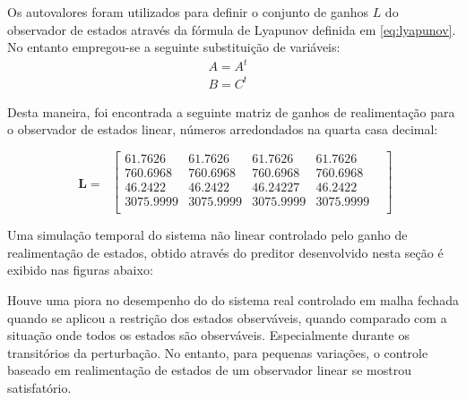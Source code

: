     Os autovalores foram utilizados para definir o conjunto de ganhos $L$ do observador de estados através da fórmula de Lyapunov definida em \ref{eq:lyapunov}. No entanto empregou-se a seguinte substituição de variáveis:
    \begin{equation} \label{eq:var_pred}
        \begin{split}
        A = A^{t}&\\
        B = C^{t}&
        \end{split}
    \end{equation}

    Desta maneira, foi encontrada a seguinte matriz de ganhos de realimentação para o observador de estados linear, números arredondados na quarta casa decimal:

    \begin{equation} \label{eq:ganhos_pred}
        \begin{split}
            \mathbf{L}=\
        \end{split}
        \begin{bmatrix}
          61.7626&   61.7626&   61.7626&   61.7626&\\
         760.6968&  760.6968&  760.6968&  760.6968&\\
          46.2422&   46.2422&   46.24227&  46.2422&\\
        3075.9999& 3075.9999& 3075.9999& 3075.9999&\\
        \end{bmatrix}
    \end{equation}

    Uma simulação temporal do sistema não linear controlado pelo ganho de realimentação de estados, obtido através do preditor desenvolvido nesta seção é exibido nas figuras abaixo:

    Houve uma piora no desempenho do do sistema real controlado em malha fechada quando se aplicou a restrição dos estados observáveis, quando comparado com a situação onde todos os estados são observáveis. Especialmente durante os transitórios da perturbação. No entanto, para pequenas variações, o controle baseado em realimentação de estados de um observador linear se mostrou satisfatório.   